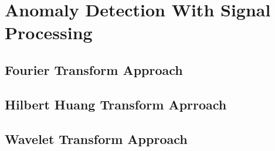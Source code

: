 \documentclass[../Main/thesis.tex]{subfiles}
\begin{document}
\chapter[Anomaly Detection With Signal Processing]{Anomaly Detection With Signal Processing}

\section{Fourier Transform Approach}
\section{Hilbert Huang Transform Aprroach}
\section{Wavelet Transform Approach}
\blankpage
\end{document}
